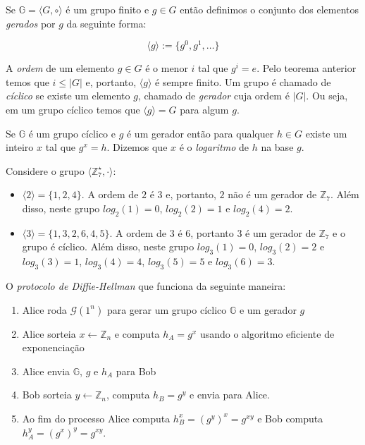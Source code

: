Se $\mathbb{G} = \langle G, \circ \rangle$ é um grupo finito e $g \in G$ então definimos o conjunto dos elementos {\em gerados} por $g$ da seguinte forma:

\begin{displaymath}
  \langle g \rangle := \{g^0, g^1, \dots \}
\end{displaymath}

A {\em ordem} de um elemento $g \in G$ é o menor $i$ tal que $g^i = e$.
Pelo teorema anterior temos que $i \leq |G|$ e, portanto, $\langle g \rangle$ é sempre finito.
Um grupo é chamado de {\em cíclico} se existe um elemento $g$, chamado de {\em gerador} cuja ordem é $|G|$.
Ou seja, em um grupo cíclico temos que $\langle g \rangle = G$ para algum $g$.

Se $\mathbb{G}$ é um grupo cíclico e $g$ é um gerador então para qualquer $h \in G$ existe um inteiro $x$ tal que $g^x = h$.
Dizemos que $x$ é o {\em logaritmo} de $h$ na base $g$.


\begin{example}
Considere o grupo $\langle \mathbb{Z}_7^\star, \cdot \rangle$:
\begin{itemize}
\item $\langle 2 \rangle = \{1, 2, 4\}$. A ordem de $2$ é $3$ e, portanto, $2$ não é um gerador de $\mathbb{Z}_7$.
Além disso, neste grupo $log_2(1) = 0$, $log_2(2) = 1$ e $log_2(4) = 2$.
\item $\langle 3 \rangle = \{1, 3, 2, 6, 4, 5\}$. A ordem de $3$ é $6$, portanto $3$ é um gerador de $\mathbb{Z}_7$ e o grupo é cíclico.
Além disso, neste grupo $log_3(1) = 0$, $log_3(2) = 2$ e $log_3(3) = 1$, $log_3(4)= 4$, $log_3(5) = 5$ e $log_3(6) = 3$.
\end{itemize}
\end{example}


O {\em protocolo de Diffie-Hellman} que funciona da seguinte maneira:
\begin{enumerate}
\item Alice roda $\mathcal{G}(1^n)$ para gerar um grupo cíclico $\mathbb{G}$ e um gerador $g$
\item Alice sorteia $x \leftarrow \mathbb{Z}_n$ e computa $h_A = g^x$ usando o algoritmo eficiente de exponenciação
\item Alice envia $\mathbb{G}$, $g$ e $h_A$ para Bob
\item Bob sorteia $y \leftarrow \mathbb{Z}_n$, computa $h_B = g^y$ e envia para Alice.
\item Ao fim do processo Alice computa $h_B^x = (g^y)^x = g^{xy}$ e Bob computa $h_A^y = (g^x)^y = g^{xy}$.
\end{enumerate}

